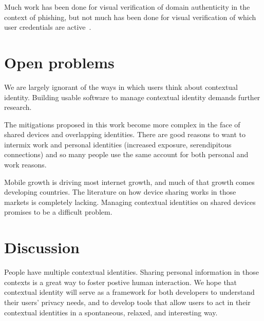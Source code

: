 \documentclass{llncs}
\begin{document}
Much work has been done for visual verification of domain authenticity in the
context of phishing, but not much has been done for visual verification of
which user credentials are active~\cite{skins}.

\section{Open problems}
We are largely ignorant of the ways in which users think about contextual
identity. Building usable software to manage contextual identity demands
further research.

The mitigations proposed in this work become more complex in the face of shared
devices and overlapping identities. There are good reasons to want to intermix
work and personal identities (increased exposure, serendipitous connections)
and so many people use the same account for both personal and work reasons.

Mobile growth is driving most internet growth, and much of that growth comes
developing countries. The literature on how device sharing works in those
markets is completely lacking. Managing contextual identities on shared devices
promises to be a difficult problem.

\section{Discussion}
People have multiple contextual identities. Sharing personal information in
those contexts is a great way to foster postive human interaction.  We hope
that contextual identity will serve as a framework for both developers to
understand their users' privacy needs, and to develop tools that allow users to
act in their contextual identities in a spontaneous, relaxed, and interesting
way.

\begin{comment}
papers:
expectation of privacy\cite{viegas}
http://jcmc.indiana.edu/vol10/issue3/viegas.html

danah boyd
making sense of privacy and publicity: whose voice counts? does your child's
teacher have a right to be public in her other roles online? does she have a
right to be secular? religious? friend? lover? if you work for company X and
you disagree with their policies, are you allowed to be public about
that:?\cite{boyd2}

close to you “stranger on a train” “stranger on a plane”
first party regrets, third party regrets
impossible to judge how big friends of friends

\end{comment}

\begin{comment}
\section{Acknowledgements}
The authors thank
Lucas Adamski
Ben Adida
Mike Connor
Ed Lee
\end{comment}



\end{document}
